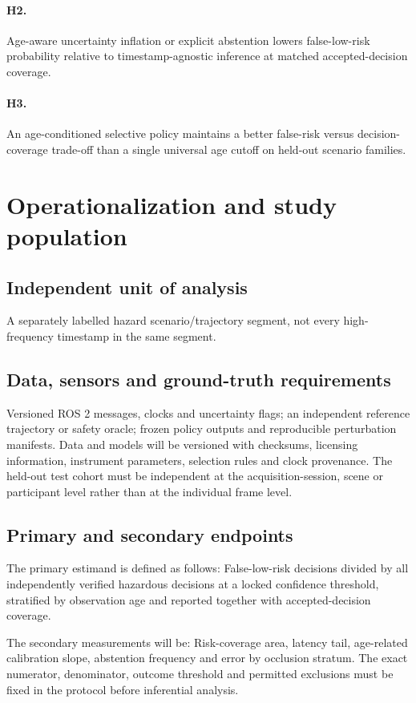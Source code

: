 \documentclass[11pt,a4paper]{article}
\begin{document}
\paragraph{H2.} Age-aware uncertainty inflation or explicit abstention lowers false-low-risk probability relative to timestamp-agnostic inference at matched accepted-decision coverage.

\paragraph{H3.} An age-conditioned selective policy maintains a better false-risk versus decision-coverage trade-off than a single universal age cutoff on held-out scenario families.

\section{Operationalization and study population}
\subsection{Independent unit of analysis}
A separately labelled hazard scenario/trajectory segment, not every high-frequency timestamp in the same segment.

\subsection{Data, sensors and ground-truth requirements}
Versioned ROS 2 messages, clocks and uncertainty flags; an independent reference trajectory or safety oracle; frozen policy outputs and reproducible perturbation manifests. Data and models will be versioned with checksums, licensing information, instrument parameters, selection rules and clock provenance. The held-out test cohort must be independent at the acquisition-session, scene or participant level rather than at the individual frame level.

\subsection{Primary and secondary endpoints}
The primary estimand is defined as follows: False-low-risk decisions divided by all independently verified hazardous decisions at a locked confidence threshold, stratified by observation age and reported together with accepted-decision coverage.

The secondary measurements will be: Risk-coverage area, latency tail, age-related calibration slope, abstention frequency and error by occlusion stratum. The exact numerator, denominator, outcome threshold and permitted exclusions must be fixed in the protocol before inferential analysis.
\end{document}
